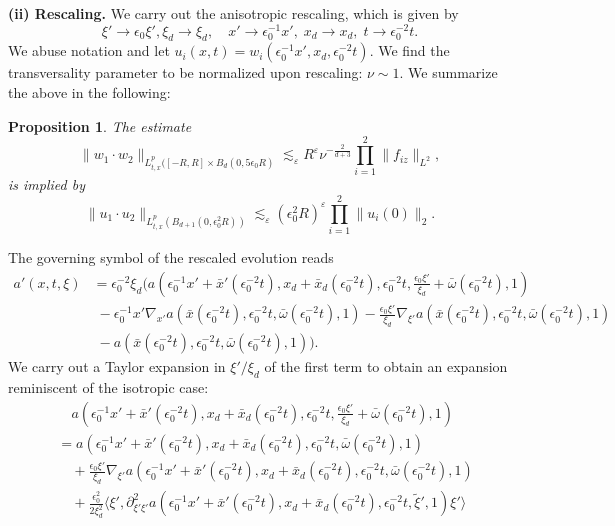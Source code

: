 \documentclass{amsart}
\newtheorem{proposition}[theorem]{Proposition}
\theoremstyle{definition}
\begin{document}
\textbf{(ii) Rescaling.} We carry out the anisotropic rescaling, which is given by
\begin{equation*}
\xi' \to \epsilon_0 \xi', \xi_d \to \xi_d, \quad x' \to \epsilon_0^{-1} x', \; x_d \to x_d, \; t \to \epsilon_0^{-2} t.
\end{equation*}
We abuse notation and let $u_i(x,t) = w_i(\epsilon_0^{-1} x',x_d,\epsilon_0^{-2} t)$. We find the transversality parameter to be normalized upon rescaling: $\nu \sim 1$. We summarize the above in the following:
\begin{proposition}
The estimate 
\begin{equation*}
\| w_1 \cdot w_2 \|_{L^p_{t,x}([-R,R] \times B_d(0,5 \epsilon_0 R)} \lesssim_\varepsilon R^\varepsilon \nu^{-\frac{2}{d+3}} \prod_{i=1}^2 \| f_{i z} \|_{L^2},
\end{equation*}
is implied by
\begin{equation}
\label{eq:RescaledUnitTransversality}
\| u_1 \cdot u_2 \|_{L^p_{t,x}(B_{d+1}(0,\epsilon_0^2 R))} \lesssim_\varepsilon (\epsilon_0^2 R)^{\varepsilon} \prod_{i=1}^2 \| u_i(0) \|_2.
\end{equation}
\end{proposition}
The governing symbol of the rescaled evolution reads
\begin{equation*}
\begin{split}
a'(x,t,\xi) &= \epsilon_0^{-2} \xi_d (a(\epsilon_0^{-1} x' + \bar{x}'(\epsilon_0^{-2} t),x_d + \bar{x}_d(\epsilon_0^{-2} t), \epsilon_0^{-2} t, \frac{\epsilon_0 \xi'}{\xi_d} + \bar{\omega}(\epsilon_0^{-2} t),1) \\
&\; - \epsilon_0^{-1} x' \nabla_{x'} a(\bar{x}(\epsilon_0^{-2} t),\epsilon_0^{-2} t, \bar{\omega}(\epsilon_0^{-2} t),1)  - \frac{\epsilon_0 \xi'}{\xi_d} \nabla_{\xi'} a(\bar{x}(\epsilon_0^{-2} t),\epsilon_0^{-2} t,\bar{\omega}(\epsilon_0^{-2} t),1) \\
&\; - a(\bar{x}(\epsilon_0^{-2} t),\epsilon_0^{-2} t, \bar{\omega}(\epsilon_0^{-2} t),1)).
\end{split}
\end{equation*}
We carry out a Taylor expansion in $\xi'/\xi_d$ of the first term to obtain an expansion reminiscent of the isotropic case:
\begin{equation*}
\begin{split}
&\quad a(\epsilon_0^{-1} x'+\bar{x}'(\epsilon_0^{-2} t),x_d+\bar{x}_d(\epsilon_0^{-2} t), \epsilon_0^{-2} t, \frac{\epsilon_0 \xi'}{\xi_d} + \bar{\omega}(\epsilon_0^{-2} t), 1) \\
&= a(\epsilon_0^{-1} x'+\bar{x}'(\epsilon_0^{-2} t),x_d+\bar{x}_d(\epsilon_0^{-2} t), \epsilon_0^{-2} t, \bar{\omega}(\epsilon_0^{-2} t), 1) \\
&\quad + \frac{\epsilon_0 \xi'}{\xi_d} \nabla_{\xi'} a(\epsilon_0^{-1} x'+\bar{x}'(\epsilon_0^{-2} t),x_d+\bar{x}_d(\epsilon_0^{-2} t), \epsilon_0^{-2} t, \bar{\omega}(\epsilon_0^{-2} t), 1) \\
&\quad + \frac{\epsilon_0^2}{2 \xi_d^2} \langle \xi', \partial^2_{\xi' \xi'} a(\epsilon_0^{-1} x'+\bar{x}'(\epsilon_0^{-2} t),x_d+\bar{x}_d(\epsilon_0^{-2} t), \epsilon_0^{-2} t, \tilde{\xi}', 1) \xi' \rangle
\end{split}
\end{equation*}
\end{document}

